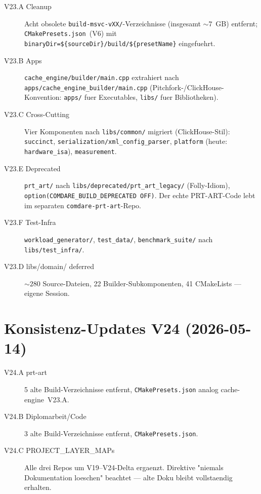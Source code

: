 \begin{description}
    \item[V23.A Cleanup] Acht obsolete \texttt{build-msvc-vXX/}-Verzeichnisse
          (insgesamt ${\sim}7$~GB) entfernt; \texttt{CMakePresets.json}~(V6)
          mit \texttt{binaryDir=\$\{sourceDir\}/build/\$\{presetName\}}
          eingefuehrt.
    \item[V23.B Apps] \texttt{cache\_engine/builder/main.cpp} extrahiert
          nach \texttt{apps/cache\_engine\_builder/main.cpp}
          (Pitchfork-/ClickHouse-Konvention: \texttt{apps/} fuer Executables,
          \texttt{libs/} fuer Bibliotheken).
    \item[V23.C Cross-Cutting] Vier Komponenten nach
          \texttt{libs/common/} migriert (ClickHouse-Stil):
          \texttt{succinct}, \texttt{serialization/xml\_config\_parser},
          \texttt{platform} (heute: \texttt{hardware\_isa}),
          \texttt{measurement}.
    \item[V23.E Deprecated] \texttt{prt\_art/} nach
          \texttt{libs/deprecated/prt\_art\_legacy/} (Folly-Idiom),
          \texttt{option(COMDARE\_BUILD\_DEPRECATED OFF)}. Der echte
          PRT-ART-Code lebt im separaten \texttt{comdare-prt-art}-Repo.
    \item[V23.F Test-Infra] \texttt{workload\_generator/},
          \texttt{test\_data/}, \texttt{benchmark\_suite/} nach
          \texttt{libs/test\_infra/}.
    \item[V23.D libs/domain/ deferred] ${\sim}280$ Source-Dateien,
          22 Builder-Subkomponenten, 41 CMakeLists --- eigene Session.
\end{description}

\section{Konsistenz-Updates V24 (2026-05-14)}

\begin{description}
    \item[V24.A prt-art] 5 alte Build-Verzeichnisse entfernt,
          \texttt{CMakePresets.json} analog cache-engine~V23.A.
    \item[V24.B Diplomarbeit/Code] 3 alte Build-Verzeichnisse entfernt,
          \texttt{CMakePresets.json}.
    \item[V24.C PROJECT\_LAYER\_MAPs] Alle drei Repos um V19--V24-Delta
          ergaenzt. Direktive "niemals Dokumentation loeschen" beachtet
          --- alte Doku bleibt vollstaendig erhalten.
\end{description}

